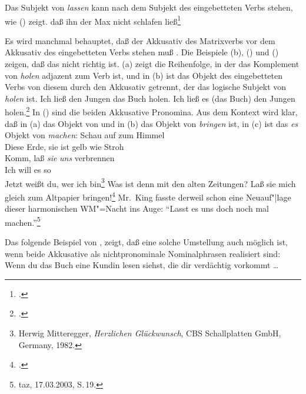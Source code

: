 Das Subjekt von \emph{lassen} kann nach dem Subjekt des eingebetteten Verbs stehen, wie ()
zeigt.
\ea
daß ihn der Max nicht schlafen ließ\footnote{
        .
}
\z

\noindent
Es wird manchmal behauptet, daß der Akkusativ des Matrixverbs
vor dem Akkusativ des eingebetteten Verbs stehen muß \citep[]{Eisenberg99a}.
Die Beispiele (b), () und () zeigen, daß das nicht richtig ist.
%
(a) zeigt die Reihenfolge, in der das Komplement von \emph{holen} adjazent zum Verb ist,
und in (b) ist das Objekt des eingebetteten Verbs von diesem durch den Akkusativ
getrennt, der das logische Subjekt von \emph{holen} ist.
\eal
\label{ex-liess-den-Jungen-das-Buch-holen}
\ex{} 
Ich ließ den Jungen    das Buch       holen.
\ex 
Ich ließ es       (das Buch)      den Jungen    holen.\footnote{
        .
}
\zl
In () sind die beiden Akkusative Pronomina. Aus dem Kontext wird klar, daß 
in (a) das Objekt von  und in (b) das Objekt von \emph{bringen}
ist, in (c) ist das \emph{es} Objekt von \emph{machen}:
\eal{}
\ex \label{ex-lass-sie-uns-verbrennen}
Schau auf zum Himmel \\
      Diese Erde, sie ist gelb wie Stroh \\
      Komm, laß \emph{sie} \emph{uns} verbrennen \\
      Ich will es so \\
      Jetzt weißt du, wer ich bin\footnote{
        Herwig Mitteregger, \emph{Herzlichen Glückwunsch}, CBS Schallplatten GmbH, Germany, 1982.
      }
\ex Was ist denn mit den alten Zeitungen? Laß sie mich gleich zum Altpapier bringen!\footnote{
        .
    }
\ex Mr.\, King fasste derweil schon eine Neuauf"|lage dieser harmonischen WM"=Nacht ins Auge: "`Lasst
    es uns doch noch mal machen."'\footnote{
        taz, 17.03.2003, S.\,19.
    }
\zl


\noindent
Das folgende Beispiel von \citet[]{Lenerz93a}, %
zeigt, daß eine solche Umstellung
auch möglich ist, wenn beide Akkusative als nichtpronominale Nominalphrasen realisiert sind:
\ea
Wenn du das Buch eine Kundin lesen siehst, die dir verdächtig vorkommt \ldots
\z

